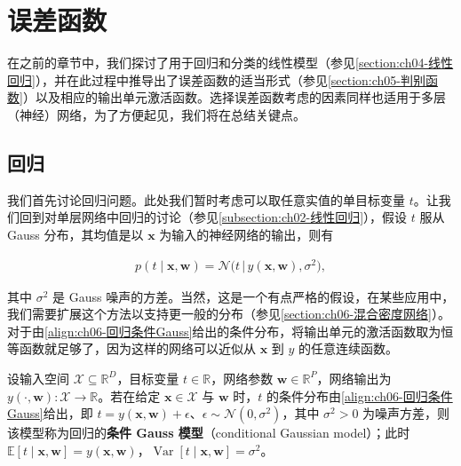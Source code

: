 \documentclass[../../main.tex]{subfiles}
\begin{document}
\section{误差函数}\label{section:ch06-误差函数}

在之前的章节中，我们探讨了用于回归和分类的线性模型（参见\cref{section:ch04-线性回归}），并在此过程中推导出了误差函数的适当形式（参见\cref{section:ch05-判别函数}）以及相应的输出单元激活函数。选择误差函数考虑的因素同样也适用于多层（神经）网络，为了方便起见，我们将在总结关键点。

\subsection{回归}\label{subsection:ch06-回归}

我们首先讨论回归问题。此处我们暂时考虑可以取任意实值的单目标变量 $t$。让我们回到对单层网络中回归的讨论（参见\cref{subsection:ch02-线性回归}），假设 $t$ 服从 Gauss 分布，其均值是以 $\boldsymbol{x}$ 为输入的神经网络的输出，则有

\begin{align}
p(t\mid\boldsymbol{x},\boldsymbol{w})=\mathcal{N}\bigl(t\,\big|\,y(\boldsymbol{x},\boldsymbol{w}),\sigma^{2}\bigr),
\label{align:ch06-回归条件Gauss}
\end{align}

其中 $\sigma^{2}$ 是 Gauss 噪声的方差。当然，这是一个有点严格的假设，在某些应用中，我们需要扩展这个方法以支持更一般的分布（参见\cref{section:ch06-混合密度网络}）。对于由\eqref{align:ch06-回归条件Gauss}给出的条件分布，将输出单元的激活函数取为恒等函数就足够了，因为这样的网络可以近似从 $\boldsymbol{x}$ 到 $y$ 的任意连续函数。

\begin{definition}\label{definition:ch06-回归条件Gauss}
设输入空间 $\mathcal{X}\subseteq\mathbb{R}^{D}$，目标变量 $t\in\mathbb{R}$，网络参数 $\boldsymbol{w}\in\mathbb{R}^{P}$，网络输出为 $y(\cdot,\boldsymbol{w}):\mathcal{X}\to\mathbb{R}$。若在给定 $\boldsymbol{x}\in\mathcal{X}$ 与 $\boldsymbol{w}$ 时，$t$ 的条件分布由\eqref{align:ch06-回归条件Gauss}给出，即 $t=y(\boldsymbol{x},\boldsymbol{w})+\epsilon$、$\epsilon\sim\mathcal{N}(0,\sigma^{2})$，其中 $\sigma^{2}>0$ 为噪声方差，则该模型称为回归的\textbf{条件 Gauss 模型}（conditional Gaussian model）；此时 $\mathbb{E}[t\mid\boldsymbol{x},\boldsymbol{w}]=y(\boldsymbol{x},\boldsymbol{w})$，$\operatorname{Var}[t\mid\boldsymbol{x},\boldsymbol{w}]=\sigma^{2}$。
\end{definition}
\end{document}
